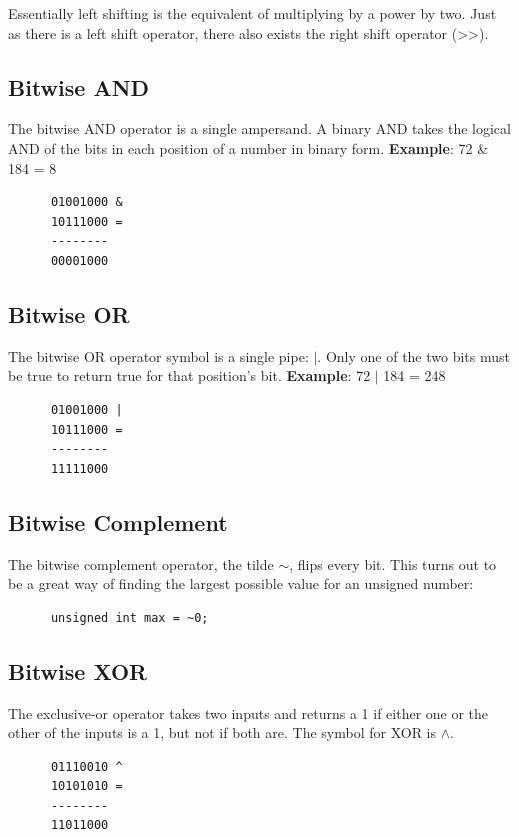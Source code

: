 \documentclass[]{book}
\begin{document}
    Essentially left shifting is the equivalent of multiplying by a power by two. Just as there is a left shift operator, there also exists
    the right shift operator (\textgreater\textgreater).

    \subsection*{Bitwise AND}
    The bitwise AND operator is a single ampersand. A binary AND takes the logical AND of the bits
    in each position of a number in binary form. \textbf{Example}: 72 \& 184 = 8
    \begin{verbatim}
      01001000 &
      10111000 =
      --------
      00001000
    \end{verbatim}

    \subsection*{Bitwise OR}
    The bitwise OR operator symbol is a single pipe: $\vert$. Only one of the two bits must be true to return true
    for that position's bit. \textbf{Example}: 72 $\vert$ 184 = 248
    \begin{verbatim}
      01001000 |
      10111000 =
      --------
      11111000
    \end{verbatim}

    \subsection*{Bitwise Complement}
    The bitwise complement operator, the tilde $\sim$, flips every bit.
    This turns out to be a great way of finding the largest possible value for an unsigned number:
    \begin{verbatim}
      unsigned int max = ~0;
    \end{verbatim}

    \subsection*{Bitwise XOR}
    The exclusive-or operator takes two inputs and returns a 1 if either one or the other of the
    inputs is a 1, but not if both are. The symbol for XOR is $\wedge$.
    \begin{verbatim}
      01110010 ^
      10101010 =
      --------
      11011000
    \end{verbatim}
\end{document}
